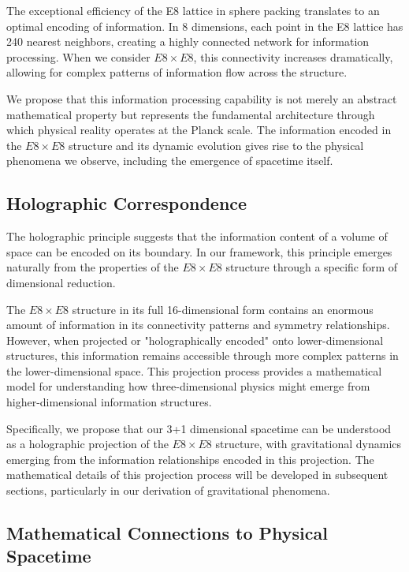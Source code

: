 \documentclass[11pt,english,twoside]{article}
\begin{document}
The exceptional efficiency of the E8 lattice in sphere packing translates to an optimal encoding of information. In 8 dimensions, each point in the E8 lattice has 240 nearest neighbors, creating a highly connected network for information processing. When we consider $E8\times E8$, this connectivity increases dramatically, allowing for complex patterns of information flow across the structure.

We propose that this information processing capability is not merely an abstract mathematical property but represents the fundamental architecture through which physical reality operates at the Planck scale. The information encoded in the $E8\times E8$ structure and its dynamic evolution gives rise to the physical phenomena we observe, including the emergence of spacetime itself.

\subsection{Holographic Correspondence}

The holographic principle suggests that the information content of a volume of space can be encoded on its boundary. In our framework, this principle emerges naturally from the properties of the $E8\times E8$ structure through a specific form of dimensional reduction.

The $E8\times E8$ structure in its full 16-dimensional form contains an enormous amount of information in its connectivity patterns and symmetry relationships. However, when projected or "holographically encoded" onto lower-dimensional structures, this information remains accessible through more complex patterns in the lower-dimensional space. This projection process provides a mathematical model for understanding how three-dimensional physics might emerge from higher-dimensional information structures.

Specifically, we propose that our 3+1 dimensional spacetime can be understood as a holographic projection of the $E8\times E8$ structure, with gravitational dynamics emerging from the information relationships encoded in this projection. The mathematical details of this projection process will be developed in subsequent sections, particularly in our derivation of gravitational phenomena.

\subsection{Mathematical Connections to Physical Spacetime}
\end{document}
